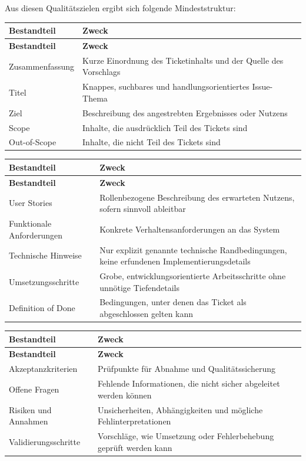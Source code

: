 \documentclass[12pt,a4paper,oneside]{scrreprt}
\newenvironment{longtable}[1]{%
  \par\medskip
  \noindent
  \begin{tabular}{#1}%
}{%
  \end{tabular}
  \par\medskip
}
\begin{document}
Aus diesen Qualitätszielen ergibt sich folgende Mindeststruktur:

\begin{longtable}{@{}>{\raggedright\arraybackslash}p{0.30\textwidth}>{\raggedright\arraybackslash}p{0.62\textwidth}@{}}
\toprule
\textbf{Bestandteil} & \textbf{Zweck} \\
\midrule
\endfirsthead
\toprule
\textbf{Bestandteil} & \textbf{Zweck} \\
\midrule
\endhead
Zusammenfassung & Kurze Einordnung des Ticketinhalts und der Quelle des Vorschlags \\
Titel & Knappes, suchbares und handlungsorientiertes Issue-Thema \\
Ziel & Beschreibung des angestrebten Ergebnisses oder Nutzens \\
Scope & Inhalte, die ausdrücklich Teil des Tickets sind \\
Out-of-Scope & Inhalte, die nicht Teil des Tickets sind \\
\bottomrule
\end{longtable}

\begin{longtable}{@{}>{\raggedright\arraybackslash}p{0.30\textwidth}>{\raggedright\arraybackslash}p{0.62\textwidth}@{}}
\toprule
\textbf{Bestandteil} & \textbf{Zweck} \\
\midrule
\endfirsthead
\toprule
\textbf{Bestandteil} & \textbf{Zweck} \\
\midrule
\endhead
User Stories & Rollenbezogene Beschreibung des erwarteten Nutzens, sofern sinnvoll ableitbar \\
Funktionale Anforderungen & Konkrete Verhaltensanforderungen an das System \\
Technische Hinweise & Nur explizit genannte technische Randbedingungen, keine erfundenen Implementierungsdetails \\
Umsetzungsschritte & Grobe, entwicklungsorientierte Arbeitsschritte ohne unnötige Tiefendetails \\
Definition of Done & Bedingungen, unter denen das Ticket als abgeschlossen gelten kann \\
\bottomrule
\end{longtable}

\begin{longtable}{@{}>{\raggedright\arraybackslash}p{0.30\textwidth}>{\raggedright\arraybackslash}p{0.62\textwidth}@{}}
\toprule
\textbf{Bestandteil} & \textbf{Zweck} \\
\midrule
\endfirsthead
\toprule
\textbf{Bestandteil} & \textbf{Zweck} \\
\midrule
\endhead
Akzeptanzkriterien & Prüfpunkte für Abnahme und Qualitätssicherung \\
Offene Fragen & Fehlende Informationen, die nicht sicher abgeleitet werden können \\
Risiken und Annahmen & Unsicherheiten, Abhängigkeiten und mögliche Fehlinterpretationen \\
Validierungsschritte & Vorschläge, wie Umsetzung oder Fehlerbehebung geprüft werden kann \\
\bottomrule
\end{longtable}
\end{document}
